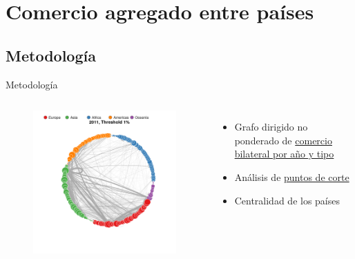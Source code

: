 \documentclass[compress]{beamer}
\begin{document}
\section{Comercio agregado entre países}

\subsection{Metodología}


\begin{frame}
\centering
\Large Metodología
\end{frame}



\begin{frame}
\begin{columns}[c] 

\begin{figure}
\includegraphics[width=1.4\linewidth]{grafo_Circ_2011_1_pcnt}
\end{figure}

\small

\begin{itemize}

\item[\faRebel] Grafo dirigido no ponderado de \underline{comercio bilateral por año y tipo} 
\item[\faRebel] Análisis de \underline{puntos de corte}
\item[\faRebel] Centralidad de los países
\end{itemize}


\end{columns}
\end{frame}
\end{document}
